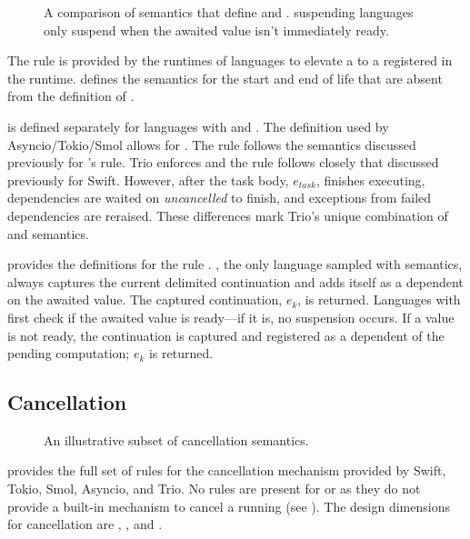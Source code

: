 \begin{figure}[tb]
  
  \cprotect\caption{A comparison of  semantics that define \dynamic and \static \suspension. \Dynamic suspending languages only suspend when the awaited value isn't immediately ready.}
  \label{fig:sem:await}
\end{figure}

The rule  is provided by the runtimes of \lazy languages to elevate a \coro to a \task registered in the runtime.  defines the semantics for the \task start and end of life that are absent from the \lazy definition of .

 is defined separately for languages with \indef and \dyn \extent. The definition used by Asyncio/Tokio/Smol allows for \indef \extent. The rule follows the semantics discussed previously for \CSharp's  rule. Trio enforces \dyn \extent and the rule follows closely that discussed previously for Swift. However, after the task body, $e_{\mathit{task}}$, finishes executing, dependencies are waited on \emph{uncancelled} to finish, and exceptions from failed dependencies are reraised. These differences mark Trio's unique combination of \awaited \destruction and \destruct \propagation semantics.

 provides the definitions for the rule . \Js, the only language sampled with \static \suspension semantics, always captures the current delimited continuation and adds itself as a dependent on the awaited value. The captured continuation, $e_{\mathit{k}}$, is returned. Languages with \dyn \suspension first check if the awaited value is ready---if it is, no suspension occurs. If a value is not ready, the continuation is captured and registered as a dependent of the pending computation; $e_{\mathit{k}}$ is returned.

\subsection{Cancellation}

\begin{figure}
  
  \cprotect\caption{An illustrative subset of cancellation semantics.}
  \label{fig:sem:cancel}
\end{figure}

 provides the full set of rules for the cancellation mechanism provided by Swift, Tokio, Smol, Asyncio, and Trio. No rules are present for \CSharp or \Js as they do not provide a built-in mechanism to cancel a running \task (see ). The design dimensions for cancellation are \awareness, \direction, and \persistence.

